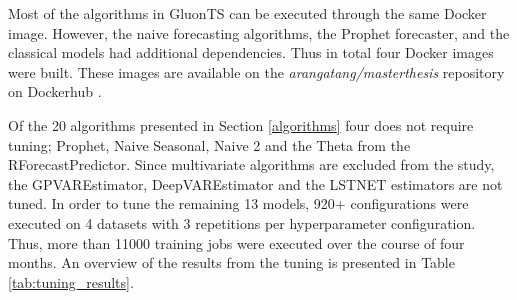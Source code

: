 Most of the algorithms in GluonTS can be executed through the same Docker image. However, the naive forecasting algorithms, the Prophet forecaster, and the classical models had additional dependencies. Thus in total four Docker images were built. These images are available on the \textit{arangatang/masterthesis} repository on Dockerhub \cite{dockerhub_arangatang}.

Of the 20 algorithms presented in Section \ref{algorithms} four does not require tuning; Prophet, Naive Seasonal, Naive 2 and the Theta from the RForecastPredictor. Since multivariate algorithms are excluded from the study, the GPVAREstimator, DeepVAREstimator and the LSTNET estimators are not tuned. In order to tune the remaining 13 models, 920+ configurations were executed on 4 datasets with 3 repetitions per hyperparameter configuration. Thus, more than 11000 training jobs were executed over the course of four months. An overview of the results from the tuning is presented in Table \ref{tab:tuning_results}.

